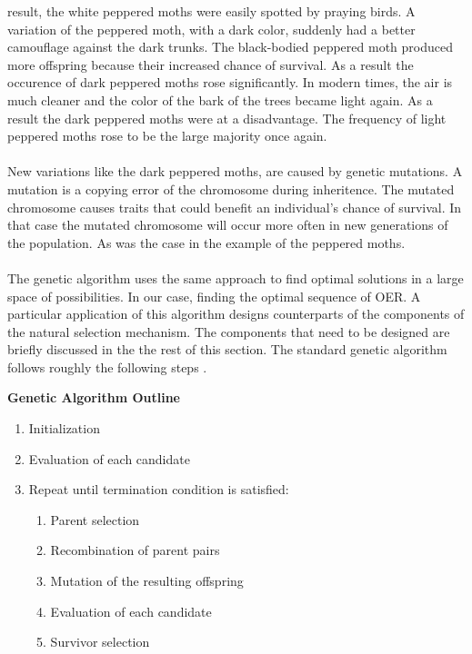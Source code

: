 result, the white peppered moths were easily spotted by praying birds. A
variation of the peppered moth, with a dark color, suddenly had a better
camouflage against the dark trunks. The black-bodied peppered moth produced
more offspring because their increased chance of survival. As a result the
occurence of dark peppered moths rose significantly.
In modern times, the air is much cleaner and the color of the bark of the trees
became light again. As a result the dark peppered moths were at a disadvantage.
The frequency of light peppered moths rose to be the large majority once
again.\\\\
\noindent
New variations like the dark peppered moths, are caused by genetic mutations. A
mutation is a copying error of the chromosome during inheritence. The
mutated chromosome causes traits that could benefit an individual's chance of
survival. In that case the mutated chromosome will occur more often in new
generations of the population. As was the case in the example of the peppered
moths.\\\\
The genetic algorithm uses the same approach to find optimal solutions in a
large space of possibilities. In our case, finding the optimal sequence of OER.
A particular application of this algorithm designs counterparts of the
components of the natural selection mechanism. The components that need to be
designed are briefly discussed in the the rest of this section. The standard
genetic algorithm follows roughly the following steps \citep{Eiben2007}.
\begin{leftbar}
\smallskip
\noindent
\textbf{Genetic Algorithm Outline}
\begin{enumerate}
	\item Initialization
	\item Evaluation of each candidate
	\item Repeat until termination condition is satisfied:
		\begin{enumerate}
			\item Parent selection
			\item Recombination of parent pairs
			\item Mutation of the resulting offspring
			\item Evaluation of each candidate
			\item Survivor selection
		\end{enumerate}
\end{enumerate}
\end{leftbar}
